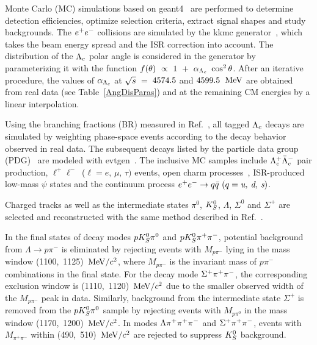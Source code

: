 \documentclass[twocolumn,showpacs,superscriptaddress,amsmath,amssymb]{revtex4-1}
\begin{document}
Monte Carlo (MC) simulations based on {\sc geant4}~\cite{geant4} are performed to determine detection efficiencies, optimize selection criteria, extract signal shapes and study backgrounds. The $e^{+}e^{-}$ collisions are simulated by the {\sc kkmc} generator~\cite{KKMC}, which takes the beam energy spread and the ISR correction into account. The distribution of the $\Lambda_{c}$ polar angle is considered in the generator by parameterizing it with the function $f(\theta)~\propto~1~+~\alpha_{\Lambda_{c}}~\cos^2\theta$. After an iterative procedure, the values of $\alpha_{\Lambda_{c}}$ at $\sqrt{s}$~=~$4574.5$ and $4599.5$~$\mathrm{MeV}$ are obtained from real data (see Table~\ref{AngDisParas}) and at the remaining CM energies by a linear interpolation. 

Using the branching fractions (BR) measured in Ref.~\cite{BAM0162}, all tagged $\Lambda_{c}$ decays are simulated by weighting phase-space events according to the decay behavior observed in real data. The subsequent decays listed by the particle data group (PDG)~\cite{PDG} are modeled with {\sc evtgen}~\cite{EVTGEN}. The inclusive MC samples include $\Lambda_{c}^{+}\bar{\Lambda}_{c}^{-}$ pair production, $\ell^{+}\ell^{-}$~($\ell=\textit{e,~$\mu$,~$\tau$})$ events, open charm processes~\cite{DDsMC}, ISR-produced low-mass $\psi$ states and the continuum process $e^{+}e^{-} \rightarrow q\bar{q}~(q=\textit{u,~d,~s})$.  

Charged tracks as well as the intermediate states $\pi^{0}$, $K_{S}^{0}$, $\Lambda$, $\Sigma^{0}$ and $\Sigma^{+}$ are selected and reconstructed with the same method described in Ref.~\cite{BAM0162}.

In the final states of decay modes $pK_{S}^{0}\pi^{0}$ and $pK_{S}^{0}\pi^{+}\pi^{-}$, potential background from $\Lambda \rightarrow p\pi^{-}$ is eliminated by rejecting events with $M_{p\pi^{-}}$ lying in the mass window (1100,~1125)~$\mathrm{MeV}/c^{2}$, where $M_{p\pi^{-}}$ is the invariant mass of $p\pi^{-}$ combinations in the final state. For the decay mode $\Sigma^{+}\pi^{+}\pi^{-}$, the corresponding exclusion window is (1110,~1120)~$\mathrm{MeV}/c^{2}$ due to the smaller observed width of the $M_{p\pi^{-}}$ peak in data. Similarly, background from the intermediate state $\Sigma^{+}$ is removed from the $pK_{S}^{0}\pi^{0}$ sample by rejecting events with $M_{p\pi^{0}}$ in the mass window (1170,~1200)~$\mathrm{MeV}/c^{2}$. In modes $\Lambda\pi^{+}\pi^{+}\pi^{-}$ and $\Sigma^{+}\pi^{+}\pi^{-}$, events with $M_{\pi^{+}\pi^{-}}$ within (490,~510)~$\mathrm{MeV}/c^{2}$ are rejected to suppress $K_{S}^{0}$ background.
\end{document}

